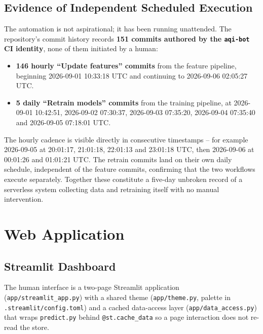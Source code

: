 \documentclass[11pt,a4paper]{article}
\begin{document}
\subsection{Evidence of Independent Scheduled Execution}

The automation is not aspirational; it has been running unattended. The
repository's commit history records \textbf{151 commits authored by the
\texttt{aqi-bot} CI identity}, none of them initiated by a human:

\begin{itemize}[itemsep=2pt]
  \item \textbf{146 hourly ``Update features'' commits} from the feature
        pipeline, beginning 2026-09-01 10:33:18 UTC and continuing to
        2026-09-06 02:05:27 UTC.
  \item \textbf{5 daily ``Retrain models'' commits} from the training
        pipeline, at 2026-09-01 10:42:51, 2026-09-02 07:30:37, 2026-09-03
        07:35:20, 2026-09-04 07:35:40 and 2026-09-05 07:18:01 UTC.
\end{itemize}

The hourly cadence is visible directly in consecutive timestamps -- for example
2026-09-05 at 20:01:17, 21:01:18, 22:01:13 and 23:01:18 UTC, then 2026-09-06 at
00:01:26 and 01:01:21 UTC. The retrain commits land on their own daily
schedule, independent of the feature commits, confirming that the two
workflows execute separately. Together these constitute a five-day unbroken
record of a serverless system collecting data and retraining itself with no
manual intervention.

\section{Web Application}

\subsection{Streamlit Dashboard}

The human interface is a two-page Streamlit application
(\texttt{app/streamlit\_app.py}) with a shared theme
(\texttt{app/theme.py}, palette in \texttt{.streamlit/config.toml}) and a
cached data-access layer (\texttt{app/data\_access.py}) that wraps
\texttt{predict.py} behind \texttt{@st.cache\_data} so a page interaction does
not re-read the store.
\end{document}
